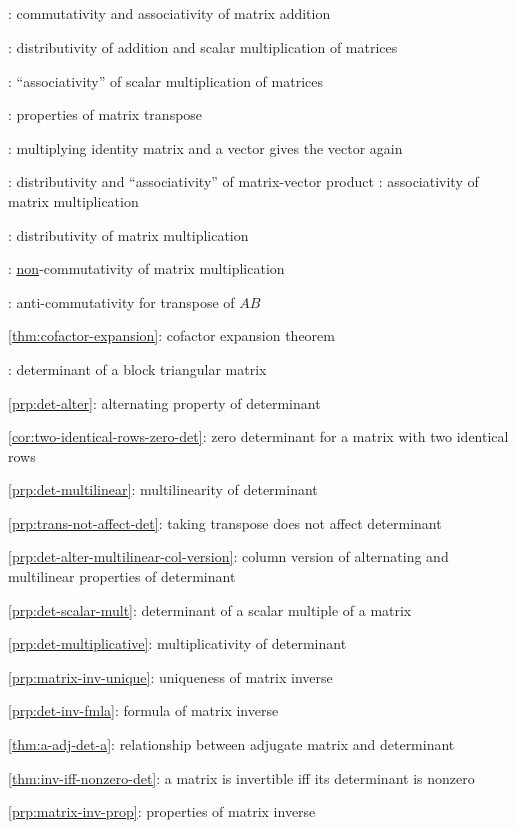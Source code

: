 \subsection*{}
\item {}: commutativity and associativity of
matrix addition
\item {}: distributivity of addition
and scalar multiplication of matrices
\item {}: ``associativity'' of scalar multiplication of matrices
\item {}: properties of matrix transpose
\item {}: multiplying identity matrix and a vector gives the vector again
\item {}: distributivity and ``associativity'' of matrix-vector product
: associativity of matrix multiplication
\item {}: distributivity of matrix multiplication
\item {}: \underline{non}-commutativity of matrix multiplication
\item {}: anti-commutativity for transpose of \(AB\)
\item \cref{thm:cofactor-expansion}: cofactor expansion theorem
\item {}: determinant of a block triangular matrix
\item \cref{prp:det-alter}: alternating property of determinant
\item \cref{cor:two-identical-rows-zero-det}: zero determinant for a matrix with two identical rows
\item \cref{prp:det-multilinear}: multilinearity of determinant
\item \cref{prp:trans-not-affect-det}: taking transpose does not affect determinant
\item \cref{prp:det-alter-multilinear-col-version}: column version of alternating and multilinear properties of determinant
\item \cref{prp:det-scalar-mult}: determinant of a scalar multiple of a matrix
\item \cref{prp:det-multiplicative}: multiplicativity of determinant
\item \cref{prp:matrix-inv-unique}: uniqueness of matrix inverse
\item \cref{prp:det-inv-fmla}: formula of matrix inverse
\item \cref{thm:a-adj-det-a}: relationship between adjugate matrix and determinant
\item \cref{thm:inv-iff-nonzero-det}: a matrix is invertible iff its determinant is nonzero
\item \cref{prp:matrix-inv-prop}: properties of matrix inverse
